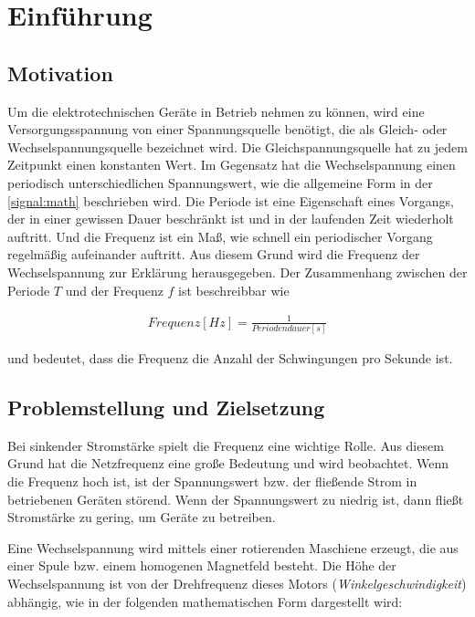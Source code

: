 \chapter{Einführung}

\section{Motivation}

Um die elektrotechnischen Geräte in Betrieb nehmen zu können, wird eine Versorgungsspannung von einer Spannungsquelle benötigt, die als Gleich- oder Wechselspannungsquelle bezeichnet wird. Die Gleichspannungsquelle hat zu jedem Zeitpunkt einen konstanten Wert. Im Gegensatz hat die Wechselspannung einen periodisch unterschiedlichen Spannungswert, wie die allgemeine Form in der \autoref{signal:math} beschrieben wird. Die Periode ist eine Eigenschaft eines Vorgangs, der in einer gewissen Dauer beschränkt ist und in der laufenden Zeit wiederholt auftritt. Und die Frequenz ist ein Maß, wie schnell ein periodischer Vorgang regelmäßig aufeinander auftritt. Aus diesem Grund wird die Frequenz der Wechselspannung zur Erklärung herausgegeben. Der Zusammenhang zwischen der Periode $T$ und der Frequenz $f$ ist beschreibbar wie 

\begin{align}
	Frequenz [Hz] = \frac{1}{Periodendauer [s]}
\end{align}

und bedeutet, dass die Frequenz die Anzahl der Schwingungen pro Sekunde ist.


\section{Problemstellung und Zielsetzung}

Bei sinkender Stromstärke spielt die Frequenz eine wichtige Rolle. Aus diesem Grund hat die Netzfrequenz eine große Bedeutung und wird beobachtet. Wenn die Frequenz hoch ist, ist der Spannungswert bzw. der fließende Strom in betriebenen Geräten störend. Wenn der Spannungswert zu niedrig ist, dann fließt Stromstärke zu gering, um Geräte zu betreiben. \smallskip \smallskip

Eine Wechselspannung wird mittels einer rotierenden Maschiene erzeugt, die aus einer Spule bzw. einem homogenen Magnetfeld besteht. Die Höhe der Wechselspannung ist von der Drehfrequenz dieses Motors (\textit{Winkelgeschwindigkeit}) abhängig, wie in der folgenden mathematischen Form dargestellt wird:


